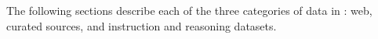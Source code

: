 
The following sections describe each of the three categories of data in \MixtureVitae{}: web, curated sources, and instruction and reasoning datasets.







